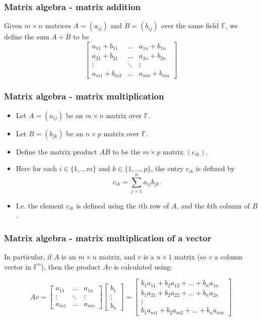 \documentclass[handout]{beamer}
\newcommand{\bF}{\mathbb{F}}
\begin{document}
\begin{frame}
\frametitle{Matrix algebra - matrix addition}
Given $m\times n$ matrices $A = (a_{ij})$ and $B=(b_{ij})$ over the same field $\bF$, we define the sum $A+B$ to be 
\[
\begin{bmatrix}
a_{11} + b_{11} & \dots & a_{1n} + b_{1n}\\
a_{21} + b_{21} &  \dots & a_{2n} + b_{2n} \\
\vdots & \ddots & \vdots \\
a_{m1} + b_{m2}  & \dots & a_{mn} + b_{mn}
\end{bmatrix}
\]
\end{frame}

\begin{frame}
\frametitle{Matrix algebra - matrix multiplication}
\begin{itemize}
\item Let $A = (a_{ij})$ be an $m\times n$ matrix over $\bF$.\vspace{0.3cm}
\item Let $B = (b_{jk})$ be an $n\times p$ matrix over $\bF$. \vspace{0.3cm}
\item Define the matrix product $AB$ to be the $m\times p$ matrix $(c_{ik})$.\vspace{0.3cm}
\item Here for each $i\in \{1,\ldots m\}$ and $k\in \{1,\ldots, p\}$, the entry $c_{ik}$ is defined by
\[c_{ik} = \sum_{j=1}^n a_{ij}b_{jk}.\]

\item I.e. the element $c_{ik}$ is defined using the $i$th row of $A$, and the $k$th column of $B$.
\end{itemize}
\end{frame}

\begin{frame}
\frametitle{Matrix algebra - matrix multiplication of a vector}
In particular, if $A$ is an $m\times n$ matrix, and $v$ is a $n\times 1$ matrix (so $v$ a column vector in $\bF^n$), then the product $Av$ is calculated using:

\[Av = \begin{bmatrix}
a_{11}  & \dots & a_{1n} \\
\vdots & \ddots & \vdots \\
a_{m1}  & \dots & a_{mn} 
\end{bmatrix}
\begin{bmatrix}
b_1\\
\vdots\\
b_n
\end{bmatrix}
=
\begin{bmatrix}
b_1a_{11} + b_2a_{12}+ \ldots + b_na_{1n} \\
b_1a_{21} + b_2a_{22}+ \ldots + b_na_{2n}\\
\vdots\\
b_1a_{m1} + b_2a_{m2}+ \ldots + b_na_{mn}
\end{bmatrix}\]
\end{frame}
\end{document}
